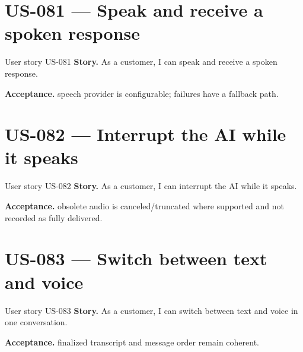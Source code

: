 \Needspace{640pt}
\section{US-081 --- Speak and receive a spoken response}

\begin{storybox}{User story US-081}
\textbf{Story.} As a customer, I can speak and receive a spoken response.\par
\textbf{Acceptance.} speech provider is configurable; failures have a fallback path.
\end{storybox}



\Needspace{521pt}
\section{US-082 --- Interrupt the AI while it speaks}

\begin{storybox}{User story US-082}
\textbf{Story.} As a customer, I can interrupt the AI while it speaks.\par
\textbf{Acceptance.} obsolete audio is canceled/truncated where supported and not recorded as fully delivered.
\end{storybox}



\Needspace{508pt}
\section{US-083 --- Switch between text and voice}

\begin{storybox}{User story US-083}
\textbf{Story.} As a customer, I can switch between text and voice in one conversation.\par
\textbf{Acceptance.} finalized transcript and message order remain coherent.
\end{storybox}



